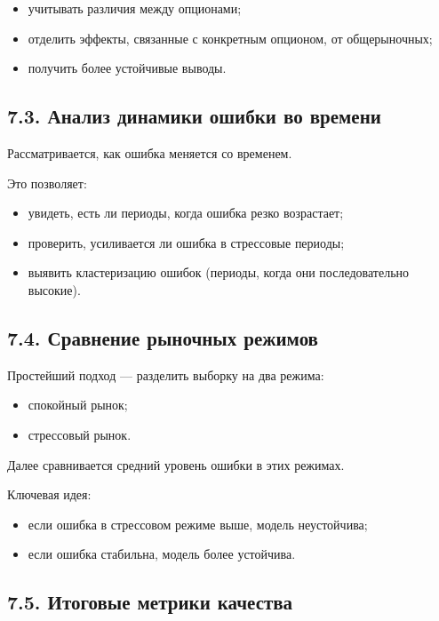 \documentclass[12pt]{article}
\begin{document}
\begin{itemize}
    \item учитывать различия между опционами;
    \item отделить эффекты, связанные с конкретным опционом, от общерыночных;
    \item получить более устойчивые выводы.
\end{itemize}

\subsection*{7.3. Анализ динамики ошибки во времени}

Рассматривается, как ошибка меняется со временем.

Это позволяет:

\begin{itemize}
    \item увидеть, есть ли периоды, когда ошибка резко возрастает;
    \item проверить, усиливается ли ошибка в стрессовые периоды;
    \item выявить кластеризацию ошибок (периоды, когда они последовательно высокие).
\end{itemize}

\subsection*{7.4. Сравнение рыночных режимов}

Простейший подход --- разделить выборку на два режима:

\begin{itemize}
    \item спокойный рынок;
    \item стрессовый рынок.
\end{itemize}

Далее сравнивается средний уровень ошибки в этих режимах.

Ключевая идея:

\begin{itemize}
    \item если ошибка в стрессовом режиме выше, модель неустойчива;
    \item если ошибка стабильна, модель более устойчива.
\end{itemize}

\subsection*{7.5. Итоговые метрики качества}
\end{document}
